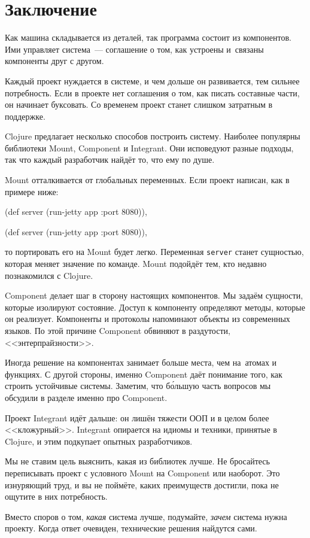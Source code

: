 \section{Заключение}

Как машина складывается из деталей, так программа состоит из компонентов. Ими
управляет система~--- соглашение о том, как устроены и~связаны компоненты друг с
другом.

Каждый проект нуждается в системе, и чем дольше он развивается, тем сильнее
потребность. Если в проекте нет соглашения о том, как писать составные части, он
начинает буксовать. Со временем проект станет слишком затратным в поддержке.

Clojure предлагает несколько способов построить систему. Наиболее популярны
библиотеки Mount, Component и Integrant. Они исповедуют разные подходы, так что
каждый разработчик найдёт то, что ему по душе.

Mount отталкивается от глобальных переменных. Если проект написан, как в примере
ниже:

\ifx\DEVICETYPE\MOBILE

\begin{english}
  \begin{clojure}
(def server
  (run-jetty app {:port 8080})),
  \end{clojure}
\end{english}

\else

\begin{english}
  \begin{clojure}
(def server (run-jetty app {:port 8080})),
  \end{clojure}
\end{english}

\fi

\noindent
то портировать его на Mount будет легко. Переменная \verb|server| станет
сущностью, которая меняет значение по команде. Mount подойдёт тем, кто недавно
познакомился с Clojure.

Component делает шаг в сторону настоящих компонентов. Мы задаём сущности, которые
изолируют состояние. Доступ к компоненту определяют методы, которые он
реализует. Компоненты и протоколы напоминают объекты из современных языков. По
этой причине Component обвиняют в раздутости, <<энтерпрайзности>>.

Иногда решение на компонентах занимает больше места, чем на~атомах и функциях. С
другой стороны, именно Component даёт понимание того, как строить устойчивые
системы. Заметим, что б\'{о}льшую часть вопросов мы обсудили в разделе именно
про Component.

Проект Integrant идёт дальше: он лишён тяжести ООП и в целом более
<<кложурный>>. Integrant опирается на идиомы и техники, принятые в Clojure, и
этим подкупает опытных разработчиков.

Мы не ставим цель выяснить, какая из библиотек лучше. Не бросайтесь переписывать
проект с условного Mount на Component или наоборот. Это изнуряющий труд, и вы не
поймёте, каких преимуществ достигли, пока не ощутите в них потребность.

Вместо споров о том, \emph{какая} система лучше, подумайте, \emph{зачем} система
нужна проекту. Когда ответ очевиден, технические решения найдутся сами.
